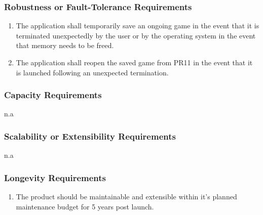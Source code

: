 \documentclass[]{article}
\begin{document}
\subsubsection{Robustness or Fault-Tolerance Requirements}
\label{ssub:robustness_or_fault_tolerance_requirements}
\begin{enumerate}[{PR}1. ]
	\resumeEnum
	\item The application shall temporarily save an ongoing game in the event that it is terminated unexpectedly by the user or by the operating system in the event that memory needs to be freed. 
	\item The application shall reopen the saved game from PR11 in the event that it is launched following an unexpected termination.
	\holdEnum
\end{enumerate}

\subsubsection{Capacity Requirements}
\label{ssub:capacity_requirements}
n.a

\subsubsection{Scalability or Extensibility Requirements}
\label{ssub:scalability_or_extensibility_requirements}
n.a

\subsubsection{Longevity Requirements}
\label{ssub:longevity_requirements}
\begin{enumerate}[{PR}1. ]
	\resumeEnum
	\item The product should be maintainable and extensible within it's planned maintenance budget for 5 years post launch.
\end{enumerate}
\end{document}
